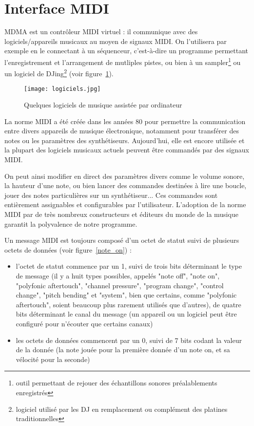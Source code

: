 \section{Interface MIDI}
\par MDMA est un contrôleur MIDI virtuel : il communique avec des logiciels/appareils musicaux au moyen de signaux MIDI. On l'utilisera par exemple en le connectant à un séquenceur, c'est-à-dire un programme permettant l'enregistrement et l'arrangement de mutliples pistes, ou bien à un sampler\footnote{outil permettant de rejouer des échantillons sonores préalablements enregistrés} ou un logiciel de DJing\footnote{logiciel utilisé par les DJ en remplacement ou complément des platines traditionnelles} (voir figure~\ref{logiciels}).
\begin{figure}
    \centering
    \texttt{[image: logiciels.jpg]}
    \caption{Quelques logiciels de musique assistée par ordinateur}
    \label{logiciels}
\end{figure}
\par La norme MIDI a été créée dans les années 80 pour permettre la communication entre divers appareils de musique électronique, notamment pour transférer des notes ou les paramètres des synthétiseurs. Aujourd'hui, elle est encore utilisée et la plupart des logiciels musicaux actuels peuvent être commandés par des signaux MIDI.
\par On peut ainsi modifier en direct des paramètres divers comme le volume sonore, la hauteur d'une note, ou bien lancer des commandes destinées à lire une boucle, jouer des notes particulières sur un synthétiseur... Ces commandes sont entièrement assignables et configurables par l'utilisateur. L'adoption de la norme MIDI par de très nombreux constructeurs et éditeurs du monde de la musique garantit la polyvalence de notre programme.
\par Un message MIDI est toujours composé d'un octet de statut suivi de plusieurs octets de données (voir figure~\ref{note_on}) :
\begin{itemize}
    \item l'octet de statut commence par un 1, suivi de trois bits  déterminant le type de message (il y a huit types possibles, appelés  "note off", "note on", "polyfonic aftertouch", "channel pressure",  "program change", "control change", "pitch bending" et "system", bien  que certains, comme "polyfonic aftertouch", soient beaucoup plus  rarement utilisés que d’autres), de quatre bits déterminant le canal du  message (un appareil ou un logiciel peut être configuré pour n’écouter  que certains canaux)
    \item les octets de données commencent par un 0, suivi de 7 bits codant la valeur de la donnée (la note jouée pour la première donnée d'un note on, et sa vélocité pour la seconde)
\end{itemize}
